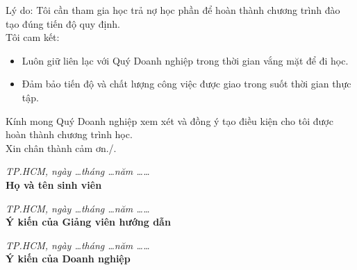 \documentclass[12pt,a4paper]{article}
\begin{document}
\noindent Lý do: Tôi cần tham gia học trả nợ học phần để hoàn thành chương trình đào tạo đúng tiến độ quy định.\\
Tôi cam kết:
\begin{itemize}
    \item Luôn giữ liên lạc với Quý Doanh nghiệp trong thời gian vắng mặt để đi học.
    \item Đảm bảo tiến độ và chất lượng công việc được giao trong suốt thời gian thực tập.
\end{itemize}

\noindent Kính mong Quý Doanh nghiệp xem xét và đồng ý tạo điều kiện cho tôi được hoàn thành chương trình học.\\
Xin chân thành cảm ơn./.

\vspace{1em}

\noindent
\begin{minipage}{0.5\textwidth}
\hfill
\end{minipage}%
\begin{minipage}{0.5\textwidth}
\begin{center}
\textit{TP.HCM, ngày \dots tháng \dots năm \dots\dots}\\
\textbf{Họ và tên sinh viên}\\
\vspace{4\baselineskip}
\end{center}
\end{minipage}

\vspace{1em}
\noindent
\begin{minipage}[t]{0.5\textwidth}
\begin{center}
\textit{TP.HCM, ngày \dots tháng \dots năm \dots\dots}\\
\textbf{Ý kiến của Giảng viên hướng dẫn}
\end{center}
\end{minipage}%
\begin{minipage}[t]{0.5\textwidth}
\begin{center}
\textit{TP.HCM, ngày \dots tháng \dots năm \dots\dots}\\
\textbf{Ý kiến của Doanh nghiệp}
\end{center}
\end{minipage}
\end{document}
